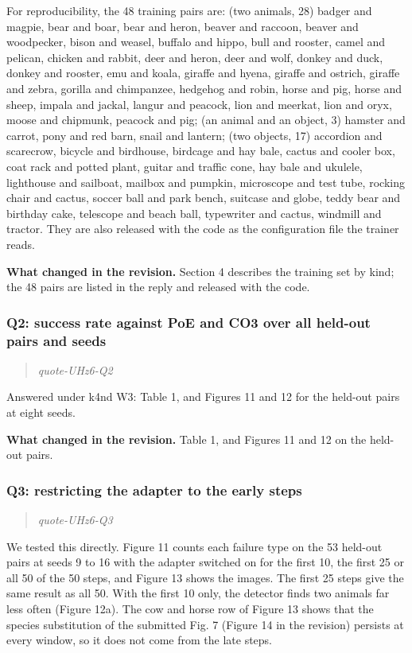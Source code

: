 \documentclass[11pt]{article}
\def\showquotes{}        %
\newcommand{\reviewquote}[2]{\ifdefined\showquotes\begin{quote}\color{rev}\itshape\csname quote-#1-#2\endcsname\end{quote}\fi}
\newcommand{\changed}[1]{\par{\color{chg}\textbf{What changed in the revision.}} #1\par}
\begin{document}
For reproducibility, the 48 training pairs are: (two animals, 28) badger and magpie, bear and boar, bear and heron, beaver and raccoon, beaver and woodpecker, bison and weasel, buffalo and hippo, bull and rooster, camel and pelican, chicken and rabbit, deer and heron, deer and wolf, donkey and duck, donkey and rooster, emu and koala, giraffe and hyena, giraffe and ostrich, giraffe and zebra, gorilla and chimpanzee, hedgehog and robin, horse and pig, horse and sheep, impala and jackal, langur and peacock, lion and meerkat, lion and oryx, moose and chipmunk, peacock and pig; (an animal and an object, 3) hamster and carrot, pony and red barn, snail and lantern; (two objects, 17) accordion and scarecrow, bicycle and birdhouse, birdcage and hay bale, cactus and cooler box, coat rack and potted plant, guitar and traffic cone, hay bale and ukulele, lighthouse and sailboat, mailbox and pumpkin, microscope and test tube, rocking chair and cactus, soccer ball and park bench, suitcase and globe, teddy bear and birthday cake, telescope and beach ball, typewriter and cactus, windmill and tractor. They are also released with the code as the configuration file the trainer reads.

\changed{Section 4 describes the training set by kind; the 48 pairs are listed in the reply and released with the code.}

\subsubsection*{Q2: success rate against PoE and CO3 over all held-out pairs and seeds}
\reviewquote{UHz6}{Q2}

Answered under k4nd W3: Table 1, and Figures 11 and 12 for the held-out pairs at eight seeds.

\changed{Table 1, and Figures 11 and 12 on the held-out pairs.}

\subsubsection*{Q3: restricting the adapter to the early steps}
\reviewquote{UHz6}{Q3}

We tested this directly. Figure 11 counts each failure type on the 53 held-out pairs at seeds 9 to 16 with the adapter switched on for the first 10, the first 25 or all 50 of the 50 steps, and Figure 13 shows the images. The first 25 steps give the same result as all 50. With the first 10 only, the detector finds two animals far less often (Figure 12a). The cow and horse row of Figure 13 shows that the species substitution of the submitted Fig. 7 (Figure 14 in the revision) persists at every window, so it does not come from the late steps.
\end{document}
